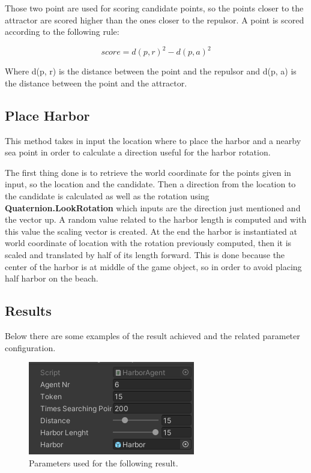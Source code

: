 \documentclass[12pt]{article}
\begin{document}
    Those two point are used for scoring candidate points, so the points closer to the attractor are scored higher than the ones closer to the repulsor. A point is scored 
    according to the following rule:

    \begin{equation}
        score = d(p, r)^2 - d(p, a)^2
    \end{equation}

    \noindent
    Where d(p, r) is the distance between the point and the repulsor and d(p, a) is the distance between the point and the attractor.

    \subsection{Place Harbor} \label{section:PlaceHarbor}
    This method takes in input the location where to place the harbor and a nearby sea point in order to calculate a direction useful for the harbor rotation.
    
    The first thing done is to retrieve the world coordinate for the points given in input, so the location and the candidate. Then a direction from the location to the 
    candidate is calculated as well as the rotation using \textbf{Quaternion.LookRotation} which inputs are the direction just mentioned and the vector up. A random value 
    related to the harbor length is computed and with this value the scaling vector is created. At the end the harbor is instantiated at world coordinate of location with 
    the rotation previously computed, then it is scaled and translated by half of its length forward. This is done because the center of the harbor is at middle of the game
    object, so in order to avoid placing half harbor on the beach.

    \subsection{Results}
    Below there are some examples of the result achieved and the related parameter configuration.

    \begin{figure}[H]
        \centering
        \includegraphics[scale = 0.8]{images/Harbor agent/Parameters 1}
        \caption{Parameters used for the following result.}
    \end{figure}
\end{document}
